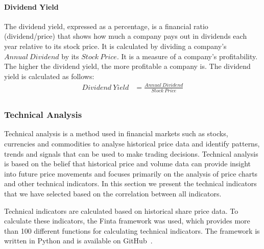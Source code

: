 \documentclass[../xlapes02]{subfiles}
\begin{document}
    \paragraph{Dividend Yield}\label{par:dividend-yield}
    The dividend yield, expressed as a percentage, is a financial ratio (dividend/price) that shows how much a company pays out in dividends each year relative to its stock price. It is calculated by dividing a company's $Annual\ Dividend$ by its $Stock\ Price$. It is a measure of a company's profitability. The higher the dividend yield, the more profitable a company is. The dividend yield is calculated as follows:
    \begin{equation}
        \label{eq:dividend-yield}
        \begin{split}
            Dividend\ Yield&=\frac{Annual\ Dividend}{Stock\ Price}\\
        \end{split}
    \end{equation}

    \subsubsection{Technical Analysis}\label{subsubsec:technical-analysis}
    Technical analysis is a method used in financial markets such as stocks, currencies and commodities to analyse historical price data and identify patterns, trends and signals that can be used to make trading decisions. Technical analysis is based on the belief that historical price and volume data can provide insight into future price movements and focuses primarily on the analysis of price charts and other technical indicators. In this section we present the technical indicators that we have selected based on the correlation between all indicators.


    Technical indicators are calculated based on historical share price data. To calculate these indicators, the Finta framework was used, which provides more than 100 different functions for calculating technical indicators. The framework is written in Python and is available on GitHub~\cite{finta}.
\end{document}
